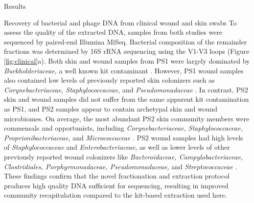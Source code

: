 \documentclass[oneside,12pt,final]{sty/ucthesis-CA2012}
\begin{document}
\begin{mainmatter}
\begin{section}{Results}
\begin{subsection}{Recovery of bacterial and phage DNA from clinical wound and skin swabs}
To assess the quality of the extracted DNA, samples from both studies were sequenced by paired-end Illumina MiSeq. Bacterial composition of the remainder fractions was determined by 16S rRNA sequencing using the V1-V3 loops (Figure \ref{fig:clinical}a). Both skin and wound samples from PS1 were largely dominated by \textit{Burkholderiaceae,} a well known kit contaminant \cite{RN70, RN71}. However, PS1 wound samples also contained low levels of previously reported skin colonizers such as \textit{Corynebacteriaceae, Staphylococcaceae,} and \textit{Pseudomonadaceae} \cite{RN72}. In contrast, PS2 skin and wound samples did not suffer from the same apparent kit contamination as PS1, and PS2 samples appear to contain archetypal skin and wound microbiomes. On average, the most abundant PS2 skin community members were commensals and opportunists, including \textit{Corynebacteriaceae, Staphylococcaceae, Proprionibacteriaceae,} and \textit{Micrococcaceae} \cite{RN72, RN73}. PS2 wound samples had high levels of \textit{Staphylococcaceae} and \textit{Enterobacteriaceae,} as well as lower levels of other previously reported wound colonizers like \textit{Bacteroidaceae, Campylobacteriaceae, Clostridiales, Porphyrmonadaceae, Pseudomonadaceae,} and \textit{Streptococcaceae} \cite{RN14, RN75, RN7}. These findings confirm that the novel fractionation and extraction protocol produces high quality DNA sufficient for sequencing, resulting in improved community recapitulation compared to the kit-based extraction used here. 


\end{subsection}
\end{section}
\end{mainmatter}
\end{document}
